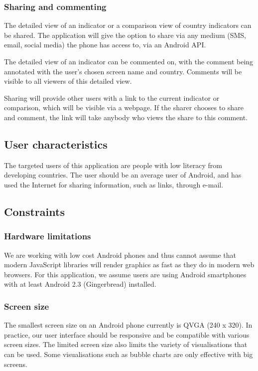 \documentclass[12pt,a4paper,twoside]{article}
\begin{document}
\subsubsection{Sharing and commenting}
The detailed view of an indicator or a comparison view of country indicators can be shared. The application will give the option to share via any medium (SMS, email, social media) the phone has access to, via an Android API.

The detailed view of an indicator can be commented on, with the comment being annotated with the user's chosen screen name and country. Comments will be visible to all viewers of this detailed view. 

Sharing will provide other users with a link to the current indicator or comparison, which will be visible via a webpage. If the sharer chooses to share and comment, the link will take anybody who views the share to this comment.

\subsection{User characteristics}
The targeted users of this application are people with low literacy from developing countries. The user should be an average user of Android, and has used the Internet for sharing information, such as links, through e-mail.

\subsection{Constraints}

\subsubsection{Hardware limitations}
We are working with low cost Android phones and thus cannot assume that modern JavaScript libraries will render graphics as fast as they do in modern web browsers. For this application, we assume users are using Android smartphones with at least Android 2.3 (Gingerbread) installed.

\subsubsection{Screen size}
The smallest screen size on an Android phone currently is QVGA (240 x 320). In practice, our user interface should be responsive and be compatible with various screen sizes. The limited screen size also limits the variety of visualisations that can be used. Some visualisations such as bubble charts are only effective with big screens.
\end{document}
